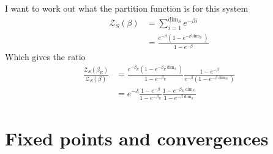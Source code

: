 \documentclass{article}
\newcommand{\partfun}{\mathcal{Z}}
\begin{document}
I want to work out what the partition function is for this system
\begin{align}
    \partfun_S(\beta) &= \sum_{i = 1}^{\dim_S} e^{-\beta i} \\
    &= \frac{e^{-\beta} (1 - e^{-\beta \dim_S})}{1 - e^{-\beta}}
\end{align}
Which gives the ratio
\begin{align}
    \frac{\partfun_S(\beta_E)}{\partfun_S(\beta)} &= \frac{e^{-\beta_E}(1 - e^{-\beta_E \dim_S})}{1 - e^{-\beta_E}} \frac{1 - e^{-\beta}}{e^{-\beta}(1 - e^{-\beta \dim_S})} \\
    &= e^{-\delta} \frac{1 - e^{-\beta}}{1 - e^{-\beta_E}} \frac{1 - e^{-\beta_E \dim_S}}{1 - e^{-\beta \dim_S}}
\end{align}


\section{Fixed points and convergences}
\end{document}
